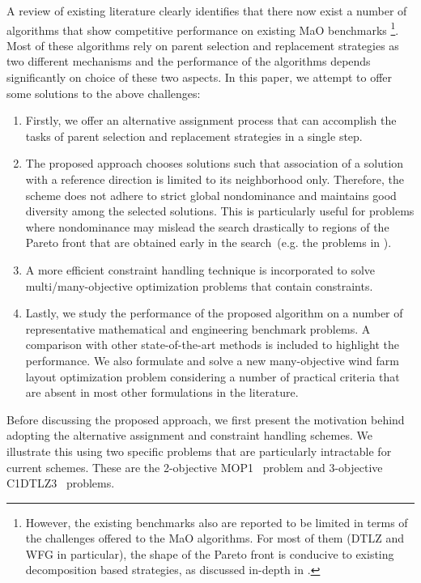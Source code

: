 A review of existing literature clearly identifies that there now exist a number of algorithms that show competitive performance on existing MaO benchmarks \footnote{However, the existing benchmarks also are reported to be limited in terms of the challenges offered to the MaO algorithms. For most of them (DTLZ and WFG in particular), the shape of the Pareto front is conducive to existing decomposition based strategies, as discussed in-depth in \cite{ishibuchi2016performance}.}. Most of these algorithms rely on parent selection and replacement strategies as two different mechanisms and the performance of the algorithms depends significantly on choice of these two aspects. In this paper, we attempt to offer some solutions to the above challenges: 

\begin{enumerate}
	\item Firstly, we offer an alternative assignment process that can accomplish the tasks of parent selection and replacement strategies in a single step. 
	\item The proposed approach chooses solutions such that association of a solution with a reference direction is limited to its neighborhood only. Therefore, the scheme does not adhere to strict global nondominance and maintains good diversity among the selected solutions. This is particularly useful for problems where nondominance may mislead the search drastically to regions of the Pareto front that are obtained early in the search~(e.g. the problems in \cite{liu2014mop}).
	\item A more efficient constraint handling technique is incorporated to solve multi/many-objective optimization problems that contain constraints. 
	\item Lastly, we study the performance of the proposed algorithm on a number of representative mathematical and engineering benchmark problems. A comparison with other state-of-the-art methods is included to highlight the performance. We also formulate and solve a new many-objective wind farm layout optimization problem considering a number of practical criteria that are absent in most other formulations in the literature. 
\end{enumerate}

Before discussing the proposed approach, we first present the motivation behind adopting the alternative assignment and constraint handling schemes. We illustrate this using two specific problems that are particularly intractable for current schemes. These are the 2-objective MOP1~\cite{liu2014mop} problem and 3-objective C1DTLZ3~\cite{Deb2014adaptive} problems. 

